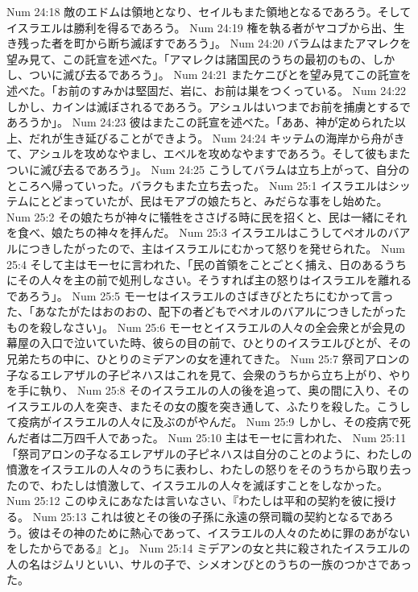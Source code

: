 Num 24:18  敵のエドムは領地となり、セイルもまた領地となるであろう。そしてイスラエルは勝利を得るであろう。
Num 24:19  権を執る者がヤコブから出、生き残った者を町から断ち滅ぼすであろう」。
Num 24:20  バラムはまたアマレクを望み見て、この託宣を述べた。「アマレクは諸国民のうちの最初のもの、しかし、ついに滅び去るであろう」。
Num 24:21  またケニびとを望み見てこの託宣を述べた。「お前のすみかは堅固だ、岩に、お前は巣をつくっている。
Num 24:22  しかし、カインは滅ぼされるであろう。アシュルはいつまでお前を捕虜とするであろうか」。
Num 24:23  彼はまたこの託宣を述べた。「ああ、神が定められた以上、だれが生き延びることができよう。
Num 24:24  キッテムの海岸から舟がきて、アシュルを攻めなやまし、エベルを攻めなやますであろう。そして彼もまたついに滅び去るであろう」。
Num 24:25  こうしてバラムは立ち上がって、自分のところへ帰っていった。バラクもまた立ち去った。
Num 25:1  イスラエルはシッテムにとどまっていたが、民はモアブの娘たちと、みだらな事をし始めた。
Num 25:2  その娘たちが神々に犠牲をささげる時に民を招くと、民は一緒にそれを食べ、娘たちの神々を拝んだ。
Num 25:3  イスラエルはこうしてペオルのバアルにつきしたがったので、主はイスラエルにむかって怒りを発せられた。
Num 25:4  そして主はモーセに言われた、「民の首領をことごとく捕え、日のあるうちにその人々を主の前で処刑しなさい。そうすれば主の怒りはイスラエルを離れるであろう」。
Num 25:5  モーセはイスラエルのさばきびとたちにむかって言った、「あなたがたはおのおの、配下の者どもでペオルのバアルにつきしたがったものを殺しなさい」。
Num 25:6  モーセとイスラエルの人々の全会衆とが会見の幕屋の入口で泣いていた時、彼らの目の前で、ひとりのイスラエルびとが、その兄弟たちの中に、ひとりのミデアンの女を連れてきた。
Num 25:7  祭司アロンの子なるエレアザルの子ピネハスはこれを見て、会衆のうちから立ち上がり、やりを手に執り、
Num 25:8  そのイスラエルの人の後を追って、奥の間に入り、そのイスラエルの人を突き、またその女の腹を突き通して、ふたりを殺した。こうして疫病がイスラエルの人々に及ぶのがやんだ。
Num 25:9  しかし、その疫病で死んだ者は二万四千人であった。
Num 25:10  主はモーセに言われた、
Num 25:11  「祭司アロンの子なるエレアザルの子ピネハスは自分のことのように、わたしの憤激をイスラエルの人々のうちに表わし、わたしの怒りをそのうちから取り去ったので、わたしは憤激して、イスラエルの人々を滅ぼすことをしなかった。
Num 25:12  このゆえにあなたは言いなさい、『わたしは平和の契約を彼に授ける。
Num 25:13  これは彼とその後の子孫に永遠の祭司職の契約となるであろう。彼はその神のために熱心であって、イスラエルの人々のために罪のあがないをしたからである』と」。
Num 25:14  ミデアンの女と共に殺されたイスラエルの人の名はジムリといい、サルの子で、シメオンびとのうちの一族のつかさであった。
